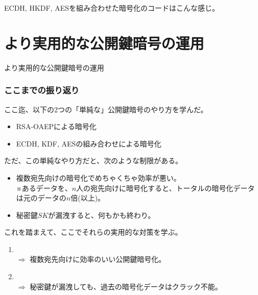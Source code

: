 \documentclass[12pt,dvipdfmx]{beamer}
\begin{document}
\begin{frame}
ECDH, HKDF, AESを組み合わせた暗号化のコードはこんな感じ。
\end{frame}


\section{より実用的な公開鍵暗号の運用}
\begin{frame}
\centering
{\Large より実用的な公開鍵暗号の運用}
\end{frame}

\begin{frame}
\frametitle{ここまでの振り返り}
ここ迄、以下の2つの「単純な」公開鍵暗号のやり方を学んだ。
\begin{itemize}
 \item RSA-OAEPによる暗号化
 \item ECDH, KDF, AESの組み合わせによる暗号化
\end{itemize}
\end{frame}

\begin{frame}
ただ、この単純なやり方だと、次のような制限がある。

\begin{itemize}
 \item 複数宛先向けの暗号化で\alert{めちゃくちゃ効率が悪い}。\\
 ※あるデータを、$n$人の宛先向けに暗号化すると、トータルの暗号化データは元のデータの$n$倍(以上)。
 \item \alert{秘密鍵$\mathit{SK}$が漏洩すると、何もかも終わり}。
\end{itemize}
\end{frame}

\begin{frame}
これを踏まえて、ここでそれらの実用的な対策を学ぶ。
\begin{enumerate}
\item {}\\
$\Rightarrow$ 複数宛先向けに効率のいい公開鍵暗号化。
\item {}\\
$\Rightarrow$ 秘密鍵が漏洩しても、過去の暗号化データはクラック不能。
\end{enumerate}
\end{frame}
\end{document}
